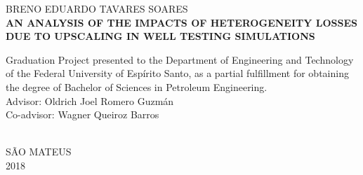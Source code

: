 \begin{titlepage}
	\center
	
	\textsc{BRENO EDUARDO TAVARES SOARES}\\[116pt]
	
	\textsc{\textbf{AN ANALYSIS OF THE IMPACTS OF HETEROGENEITY LOSSES DUE TO UPSCALING IN WELL TESTING SIMULATIONS}}\\[104pt]
	
\hfill\begin{minipage}{0.5\linewidth}
Graduation Project presented to the Department of Engineering and Technology of the Federal University of Esp\'irito Santo, as a partial fulfillment for obtaining the degree of Bachelor of Sciences in Petroleum Engineering.\\[12pt]
Advisor: Oldrich Joel Romero Guzm\'an\\
Co-advisor: Wagner Queiroz Barros 
\end{minipage}\\[116pt]

	\textsc{S\~AO MATEUS}\\
	\textsc{2018}\\
\end{titlepage}
